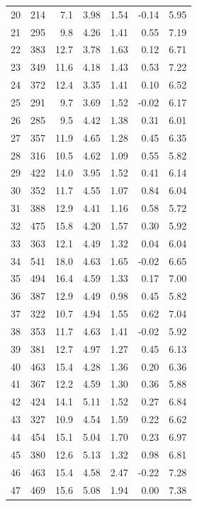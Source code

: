 \begin{longtable}{rrrrrrr}
  20  &  214 &   7.1 &    3.98 &   1.54 &    -0.14 &    5.95 \\
  21  &  295 &   9.8 &    4.26 &   1.41 &     0.55 &    7.19 \\
  22  &  383 &  12.7 &    3.78 &   1.63 &     0.12 &    6.71 \\
  23  &  349 &  11.6 &    4.18 &   1.43 &     0.53 &    7.22 \\
  24  &  372 &  12.4 &    3.35 &   1.41 &     0.10 &    6.52 \\
  25  &  291 &   9.7 &    3.69 &   1.52 &    -0.02 &    6.17 \\
  26  &  285 &   9.5 &    4.42 &   1.38 &     0.31 &    6.01 \\
  27  &  357 &  11.9 &    4.65 &   1.28 &     0.45 &    6.35 \\
  28  &  316 &  10.5 &    4.62 &   1.09 &     0.55 &    5.82 \\
  29  &  422 &  14.0 &    3.95 &   1.52 &     0.41 &    6.14 \\
  30  &  352 &  11.7 &    4.55 &   1.07 &     0.84 &    6.04 \\
  31  &  388 &  12.9 &    4.41 &   1.16 &     0.58 &    5.72 \\
  32  &  475 &  15.8 &    4.20 &   1.57 &     0.30 &    5.92 \\
  33  &  363 &  12.1 &    4.49 &   1.32 &     0.04 &    6.04 \\
  34  &  541 &  18.0 &    4.63 &   1.65 &    -0.02 &    6.65 \\
  35  &  494 &  16.4 &    4.59 &   1.33 &     0.17 &    7.00 \\
  36  &  387 &  12.9 &    4.49 &   0.98 &     0.45 &    5.82 \\
  37  &  322 &  10.7 &    4.94 &   1.55 &     0.62 &    7.04 \\
  38  &  353 &  11.7 &    4.63 &   1.41 &    -0.02 &    5.92 \\
  39  &  381 &  12.7 &    4.97 &   1.27 &     0.45 &    6.13 \\
  40  &  463 &  15.4 &    4.28 &   1.36 &     0.20 &    6.36 \\
  41  &  367 &  12.2 &    4.59 &   1.30 &     0.36 &    5.88 \\
  42  &  424 &  14.1 &    5.11 &   1.52 &     0.27 &    6.84 \\
  43  &  327 &  10.9 &    4.54 &   1.59 &     0.22 &    6.62 \\
  44  &  454 &  15.1 &    5.04 &   1.70 &     0.23 &    6.97 \\
  45  &  380 &  12.6 &    5.13 &   1.32 &     0.98 &    6.81 \\
  46  &  463 &  15.4 &    4.58 &   2.47 &    -0.22 &    7.28 \\
  47  &  469 &  15.6 &    5.08 &   1.94 &     0.00 &    7.38 \\
\end{longtable}
